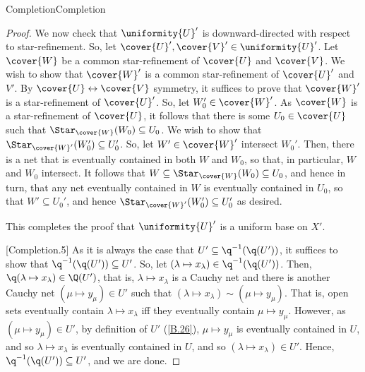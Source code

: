 \begin{thm}{Completion}{Completion}
\begin{proof}
We now check that $\uniformity{U}'$ is downward-directed with respect to star-refinement.  So, let $\cover{U}',\cover{V}'\in \uniformity{U}'$.  Let $\cover{W}$ be a common star-refinement of $\cover{U}$ and $\cover{V}$.  We wish to show that $\cover{W}'$ is a common star-refinement of $\cover{U}'$ and $V'$.  By $\cover{U}\leftrightarrow \cover{V}$ symmetry, it suffices to prove that $\cover{W}'$ is a star-refinement of $\cover{U}'$.  So, let $W_0'\in \cover{W}'$.  As $\cover{W}$ is a star-refinement of $\cover{U}$, it follows that there is some $U_0\in \cover{U}$ such that $\Star _{\cover{W}}(W_0)\subseteq U_0$.  We wish to show that $\Star _{\cover{W}'}(W_0')\subseteq U_0'$.  So, let $W'\in \cover{W}'$ intersect $W_0'$.  Then, there is a net that is eventually contained in both $W$ and $W_0$, so that, in particular, $W$ and $W_0$ intersect.  It follows that $W\subseteq \Star _{\cover{W}}(W_0)\subseteq U_0$, and hence in turn, that any net eventually contained in $W$ is eventually contained in $U_0$, so that $W'\subseteq U_0'$, and hence $\Star _{\cover{W}'}(W_0')\subseteq U_0'$ as desired.

This completes the proof that $\uniformity{U}'$ is a uniform base on $X'$.

[Completion.5]
As it is always the case that $U'\subseteq \q ^{-1}(\q (U'))$, it suffices to show that $\q ^{-1}(\q (U'))\subseteq U'$.  So, let $(\lambda \mapsto x_{\lambda})\in \q ^{-1}(\q (U'))$.  Then, $\q (\lambda \mapsto x_{\lambda})\in \Q (U')$, that is, $\lambda \mapsto x_{\lambda}$ is a Cauchy net and there is another Cauchy net $(\mu \mapsto y_{\mu})\in U'$ such that $(\lambda \mapsto x_{\lambda})\sim (\mu \mapsto y_{\mu})$.  That is, open sets eventually contain $\lambda \mapsto x_{\lambda}$ iff they eventually contain $\mu \mapsto y_{\mu}$.  However, as $(\mu \mapsto y_{\mu})\in U'$, by definition of $U'$ (\eqref{B.26}), $\mu \mapsto y_{\mu}$ is eventually contained in $U$, and so $\lambda \mapsto x_{\lambda}$ is eventually contained in $U$, and so $(\lambda \mapsto x_{\lambda})\in U'$.  Hence, $\q ^{-1}(\q (U'))\subseteq U'$, and we are done.


\end{proof}
\end{thm}
